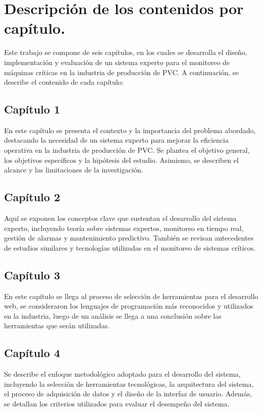 \section{Descripción de los contenidos por capítulo.} 

Este trabajo se compone de seis capítulos, en los cuales se desarrolla el diseño, implementación y evaluación de un sistema experto para el monitoreo de máquinas críticas en la industria de producción de PVC. A continuación, se describe el contenido de cada capítulo: \\

\subsection{Capítulo 1}
En este capítulo se presenta el contexto y la importancia del problema abordado, destacando la necesidad de un sistema experto para mejorar la eficiencia operativa en la industria de producción de PVC. Se plantea el objetivo general, los objetivos específicos y la hipótesis del estudio. Asimismo, se describen el alcance y las limitaciones de la investigación.
\subsection{Capítulo 2}
Aquí se exponen los conceptos clave que sustentan el desarrollo del sistema experto, incluyendo teoría sobre sistemas expertos, monitoreo en tiempo real, gestión de alarmas y mantenimiento predictivo. También se revisan antecedentes de estudios similares y tecnologías utilizadas en el monitoreo de sistemas críticos.
\subsection{Capítulo 3}
En este capítulo se llega al proceso de selección de herramientas para el desarrollo web, se consideraron los lenguajes de programación más reconocidos y utilizados en la industria, luego de un análisis se llega a una conclusión sobre las herramientas que serán utilizadas.

\subsection{Capítulo 4}
Se describe el enfoque metodológico adoptado para el desarrollo del sistema, incluyendo la selección de herramientas tecnológicas, la arquitectura del sistema, el proceso de adquisición de datos y el diseño de la interfaz de usuario. Además, se detallan los criterios utilizados para evaluar el desempeño del sistema.
